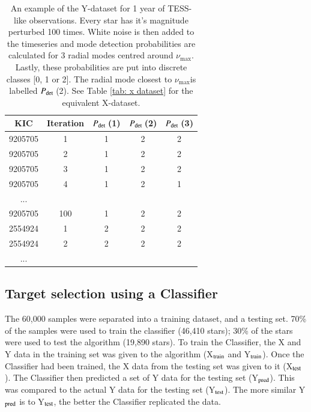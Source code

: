 \documentclass[a4paper,fleqn,usenatbib,useAMS]{mnras}
\newcommand{\numax}{\ensuremath{\nu_{\textrm{max}}}}
\newcommand{\pdet}{\ensuremath{P_{\rm det}\:}}
\begin{document}
\begin{table}
\begin{center}
\begin{tabular}{|*{5}{c|}}
KIC & Iteration & \pdet(1) & \pdet(2) & \pdet(3) \\
\hline
9205705	& 1     & 1 & 2 & 2 \\
9205705	& 2     & 1 & 2 & 2 \\
9205705	& 3     & 1 & 2 & 2 \\
9205705	& 4     & 1 & 2 & 1 \\
...                         \\
9205705	& 100   & 1 & 2 & 2 \\
2554924	& 1	    & 2 & 2 & 2 \\
2554924	& 2     & 2 & 2 & 2 \\
...                         \\
\hline
\end{tabular}
\end{center}
\caption{An example of the Y-dataset for 1 year of TESS-like observations. Every star has it's magnitude perturbed 100 times. White noise is then added to the timeseries and mode detection probabilities are calculated for 3 radial modes centred around \numax. Lastly, these probabilities are put into discrete classes [0, 1 or 2]. The radial mode closest to \numax is labelled \pdet(2). See Table \ref{tab: x dataset} for the equivalent X-dataset.}
\label{tab: y dataset}
\end{table}



\subsection{Target selection using a Classifier}
\label{sect: class-results}

The 60,000 samples were separated into a training dataset, and a testing set. 70\% of the samples were used to train the classifier (46,410 stars); 30\% of the stars were used to test the algorithm (19,890 stars). To train the Classifier, the X and Y data in the training set was given to the algorithm (X$_{\rm train}$ and Y$_{\rm train}$). Once the Classifier had been trained, the X data from the testing set was given to it (X$_{\rm test}$). The Classifier then predicted a set of Y data for the testing set (Y$_{\rm pred}$). This was compared to the actual Y data for the testing set (Y$_{\rm test}$). The more similar Y$_{\rm pred}$ is to Y$_{\rm test}$, the better the Classifier replicated the data.
\end{document}
